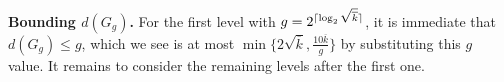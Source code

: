 \documentclass[journal]{IEEEtran}
\theoremstyle{definition}
\theoremstyle{definition}
\newcommand{\PP}{\mathbb{P}}
\newcommand{\kb}{\overline{k}}
\DeclarePairedDelimiter\ceil{\lceil}{\rceil}
\newcommand{\bigO}{\mathcal{O}}
\begin{document}

\medskip
\textbf{Bounding $d(G_g)$.} For the first level with $g =  2^{\ceil{\log_2 \sqrt{\kb}}}$, it is immediate that $d(G_g) \leq g$, which we see is at most $\min \{2\sqrt{\kb}, \frac{10\kb}{g} \}$ by substituting this $g$ value.  It remains to consider the remaining levels after the first one.
\end{document}

